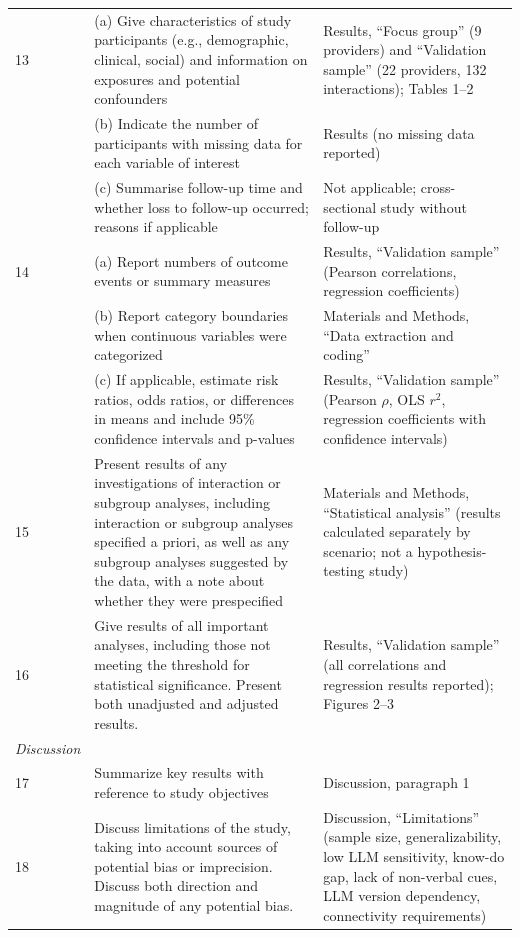 \documentclass{article}
\begin{document}
\begin{table}[h]
\begin{tabular}{p{}p{}p{}}
13 & (a) Give characteristics of study participants (e.g., demographic, clinical, social) and information on exposures and potential confounders & Results, ``Focus group'' (9 providers) and ``Validation sample'' (22 providers, 132 interactions); Tables 1--2 \\
  & (b) Indicate the number of participants with missing data for each variable of interest & Results (no missing data reported) \\
  & (c) Summarise follow-up time and whether loss to follow-up occurred; reasons if applicable & Not applicable; cross-sectional study without follow-up \\

14 & (a) Report numbers of outcome events or summary measures & Results, ``Validation sample'' (Pearson correlations, regression coefficients) \\
  & (b) Report category boundaries when continuous variables were categorized & Materials and Methods, ``Data extraction and coding'' \\
  & (c) If applicable, estimate risk ratios, odds ratios, or differences in means and include 95\% confidence intervals and p-values & Results, ``Validation sample'' (Pearson $\rho$, OLS $r^{2}$, regression coefficients with confidence intervals) \\

15 & Present results of any investigations of interaction or subgroup analyses, including interaction or subgroup analyses specified a priori, as well as any subgroup analyses suggested by the data, with a note about whether they were prespecified & Materials and Methods, ``Statistical analysis'' (results calculated separately by scenario; not a hypothesis-testing study) \\

16 & Give results of all important analyses, including those not meeting the threshold for statistical significance. Present both unadjusted and adjusted results. & Results, ``Validation sample'' (all correlations and regression results reported); Figures 2--3 \\

\midrule
\textit{Discussion} & & \\
\midrule

17 & Summarize key results with reference to study objectives & Discussion, paragraph 1 \\

18 & Discuss limitations of the study, taking into account sources of potential bias or imprecision. Discuss both direction and magnitude of any potential bias. & Discussion, ``Limitations'' (sample size, generalizability, low LLM sensitivity, know-do gap, lack of non-verbal cues, LLM version dependency, connectivity requirements) \\


\end{tabular}
\end{table}
\end{document}
